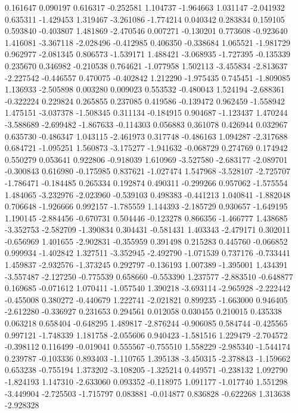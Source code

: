 0.161647
0.090197
0.616317
-0.252581
1.104737
-1.964663
1.031147
-2.041932
0.635311
-1.429453
1.319467
-3.261086
-1.774214
0.040342
0.283834
0.159105
0.593840
-0.403807
1.481869
-2.470546
0.007271
-0.130201
0.773608
-0.923640
1.416081
-3.367118
-2.028496
-0.412985
0.406350
-0.338684
1.065521
-1.981729
0.962977
-2.081345
0.806573
-1.539171
1.488421
-3.068935
-1.727395
-0.135339
0.235670
0.346982
-0.210538
0.764621
-1.077958
1.502113
-3.455834
-2.813637
-2.227542
-0.446557
0.470075
-0.402842
1.212290
-1.975435
0.745451
-1.809085
1.136933
-2.505898
0.003280
0.009023
0.553532
-0.480043
1.524194
-2.688361
-0.322224
0.229824
0.265855
0.237085
0.419586
-0.139472
0.962459
-1.558942
1.475151
-3.037378
-1.508345
0.311134
-0.184915
0.904687
-1.123437
1.470244
-3.588689
-2.699482
-1.867633
-0.114303
0.056883
0.361078
0.426944
0.032967
0.635730
-0.486347
1.043115
-2.461973
0.317748
-0.486163
1.094287
-2.317688
0.684721
-1.095251
1.560873
-3.175277
-1.941632
-0.068729
0.274769
0.174942
0.550279
0.053641
0.922806
-0.918039
1.610969
-3.527580
-2.683177
-2.089701
-0.300843
0.616980
-0.175985
0.837621
-1.027474
1.547968
-3.528107
-2.725707
-1.786471
-0.184485
0.265334
0.192874
0.490311
-0.299266
0.957062
-1.575554
1.484065
-3.232976
-2.023960
-0.539103
0.498383
-0.441213
1.040841
-1.882048
0.706648
-1.926666
0.992157
-1.785559
1.144393
-2.185729
0.930657
-1.649195
1.190145
-2.884456
-0.670731
0.504446
-0.123278
0.866356
-1.466777
1.438685
-3.352753
-2.582709
-1.390834
0.304431
-0.581431
1.403343
-2.479171
0.302011
-0.656969
1.401655
-2.902831
-0.355959
0.391498
0.215283
0.445760
-0.066852
0.999934
-1.402842
1.327511
-3.352945
-2.492790
-1.071539
0.737176
-0.733441
1.459837
-2.932576
-1.373245
0.292797
-0.136193
1.007389
-1.395001
1.434391
-3.557487
-2.127250
-0.775539
0.658660
-0.553390
1.237577
-2.883510
-0.648877
0.169685
-0.071612
1.070411
-1.057540
1.390218
-3.693114
-2.965928
-2.222442
-0.455008
0.380272
-0.440679
1.222741
-2.021821
0.899235
-1.663000
0.946405
-2.612280
-0.336927
0.231653
0.294561
0.012058
0.030455
0.210015
0.435338
0.063218
0.658404
-0.648295
1.489817
-2.876244
-0.906085
0.584744
-0.425565
0.997121
-1.748339
1.181758
-2.055606
0.940423
-1.581516
1.229479
-2.704572
-0.398112
0.116499
-0.019041
0.555567
-0.755510
1.558229
-2.985340
-1.544174
0.239787
-0.103336
0.893403
-1.110765
1.395138
-3.450315
-2.378843
-1.159662
0.653238
-0.755194
1.373202
-3.108205
-1.325214
0.449571
-0.238132
1.092790
-1.824193
1.147310
-2.633060
0.093352
-0.118975
1.091177
-1.017740
1.551298
-3.449904
-2.725503
-1.715797
0.083881
-0.014877
0.836828
-0.622268
1.313638
-2.928328
